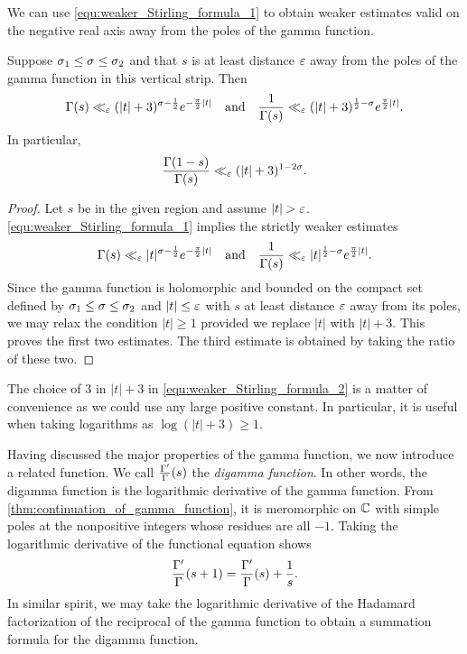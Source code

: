 \documentclass[12pt]{article}
\begin{document}
    We can use \cref{equ:weaker_Stirling_formula_1} to obtain weaker estimates valid on the negative real axis away from the poles of the gamma function.

    \begin{corollary}\label{equ:weaker_Stirling_formula_2}
      Suppose \(\sigma_{1} \le \sigma \le \sigma_{2}\) and that \(s\) is at least distance \(\varepsilon\) away from the poles of the gamma function in this vertical strip. Then
      \[
        \Gamma(s) \ll_{\varepsilon} (|t|+3)^{\sigma-\frac{1}{2}}e^{-\frac{\pi}{2}|t|} \quad \text{and} \quad \frac{1}{\Gamma(s)} \ll_{\varepsilon} (|t|+3)^{\frac{1}{2}-\sigma}e^{\frac{\pi}{2}|t|}.
      \]
      In particular,
      \[
        \frac{\Gamma(1-s)}{\Gamma(s)} \ll_{\varepsilon} (|t|+3)^{1-2\sigma}.
      \]
    \end{corollary}
    \begin{proof}
      Let \(s\) be in the given region and assume \(|t| > \varepsilon\). \cref{equ:weaker_Stirling_formula_1} implies the strictly weaker estimates
      \[
        \Gamma(s) \ll_{\varepsilon} |t|^{\sigma-\frac{1}{2}}e^{-\frac{\pi}{2}|t|} \quad \text{and} \quad \frac{1}{\Gamma(s)} \ll_{\varepsilon} |t|^{\frac{1}{2}-\sigma}e^{\frac{\pi}{2}|t|}.
      \]
      Since the gamma function is holomorphic and bounded on the compact set defined by \(\sigma_{1} \le \sigma \le \sigma_{2}\) and \(|t| \le \varepsilon\) with \(s\) at least distance \(\varepsilon\) away from its poles, we may relax the condition \(|t| \ge 1\) provided we replace \(|t|\) with \(|t|+3\). This proves the first two estimates. The third estimate is obtained by taking the ratio of these two.
    \end{proof}

    The choice of \(3\) in \(|t|+3\) in \cref{equ:weaker_Stirling_formula_2} is a matter of convenience as we could use any large positive constant. In particular, it is useful when taking logarithms as \(\log(|t|+3) \ge 1\).

    Having discussed the major properties of the gamma function, we now introduce a related function. We call \(\frac{\Gamma'}{\Gamma}(s)\) the \textit{digamma function}. In other words, the digamma function is the logarithmic derivative of the gamma function. From \cref{thm:continuation_of_gamma_function}, it is meromorphic on \(\mathbb{C}\) with simple poles at the nonpositive integers whose residues are all \(-1\). Taking the logarithmic derivative of the functional equation shows
    \[
      \frac{\Gamma'}{\Gamma}(s+1) = \frac{\Gamma'}{\Gamma}(s)+\frac{1}{s}.
    \]
    In similar spirit, we may take the logarithmic derivative of the Hadamard factorization of the reciprocal of the gamma function to obtain a summation formula for the digamma function.
\end{document}
